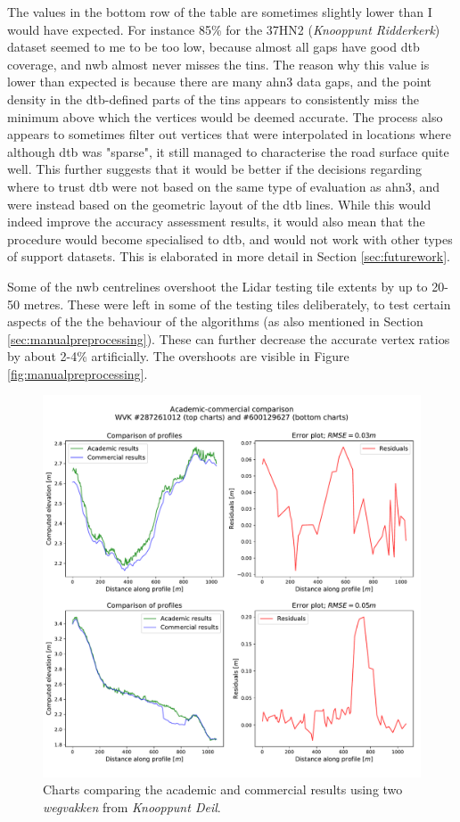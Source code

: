 The values in the bottom row of the table are sometimes slightly lower than I would have expected. For instance 85\% for the 37HN2 (\textit{Knooppunt Ridderkerk}) dataset seemed to me to be too low, because almost all gaps have good \ac{dtb} coverage, and \ac{nwb} almost never misses the \ac{tin}s. The reason why this value is lower than expected is because there are many \ac{ahn3} data gaps, and the point density in the \ac{dtb}-defined parts of the \ac{tin}s appears to consistently miss the minimum above which the vertices would be deemed accurate. The process also appears to sometimes filter out vertices that were interpolated in locations where although \ac{dtb} was "sparse", it still managed to characterise the road surface quite well. This further suggests that it would be better if the decisions regarding where to trust \ac{dtb} were not based on the same type of evaluation as \ac{ahn3}, and were instead based on the geometric layout of the \ac{dtb} lines. While this would indeed improve the accuracy assessment results, it would also mean that the procedure would become specialised to \ac{dtb}, and would not work with other types of support datasets. This is elaborated in more detail in Section \ref{sec:futurework}.

Some of the \ac{nwb} centrelines overshoot the Lidar testing tile extents by up to 20-50 metres. These were left in some of the testing tiles deliberately, to test certain aspects of the the behaviour of the algorithms (as also mentioned in Section \ref{sec:manualpreprocessing}). These can further decrease the accurate vertex ratios by about 2-4\% artificially. The overshoots are visible in Figure \ref{fig:manualpreprocessing}.

\begin{figure}[h]
    \centering
    \includegraphics[width=0.87\linewidth]{final_report/figs/commercialcomparison0.pdf}
    \caption{Charts comparing the academic and commercial results using two \textit{wegvakken} from \textit{Knooppunt Deil}.}
    \label{fig:commercialcomparison0}
\end{figure}

